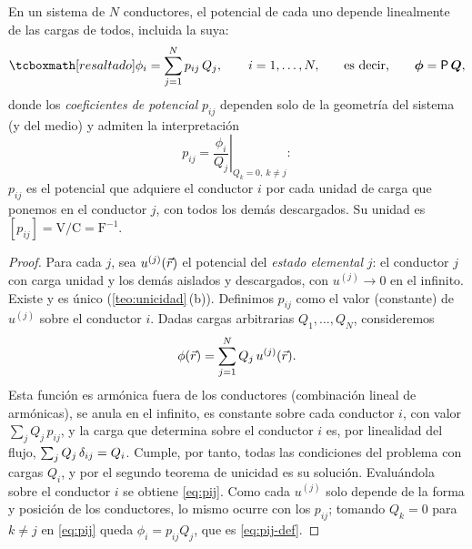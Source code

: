\begin{teorema}\label{teo:pij}
En un sistema de $N$ conductores, el potencial de cada uno depende linealmente de las cargas de todos, incluida la suya:
\begin{equation}\label{eq:pij}
  \resalta{\phi_i=\sum_{j=1}^{N}p_{ij}\,Q_j,\qquad i=1,\dots,N,}\qquad\text{es decir,}\qquad\vphi=\Pm\,\vQ ,
\end{equation}
donde los \emph{coeficientes de potencial} $p_{ij}$ dependen solo de la geometría del sistema (y del medio) y admiten la interpretación
\begin{equation}\label{eq:pij-def}
  p_{ij}=\left.\frac{\phi_i}{Q_j}\right|_{Q_k=0,\ k\neq j}:
\end{equation}
$p_{ij}$ es el potencial que adquiere el conductor $i$ por cada unidad de carga que ponemos en el conductor $j$, con todos los demás descargados.
Su unidad es $[p_{ij}]=\mathrm{V/C}=\mathrm{F^{-1}}$.
\end{teorema}
\begin{proof}
Para cada $j$, sea $u^{(j)}(\vec{r})$ el potencial del \emph{estado elemental} $j$: el conductor $j$ con carga unidad y los demás aislados y descargados,
con $u^{(j)}\to0$ en el infinito. Existe y es único (\cref{teo:unicidad}\,(b)). Definimos $p_{ij}$ como el valor (constante) de $u^{(j)}$ sobre el
conductor $i$. Dadas cargas arbitrarias $Q_1,\dots,Q_N$, consideremos
\[
  \phi(\vec{r})=\sum_{j=1}^{N}Q_j\,u^{(j)}(\vec{r}) .
\]
Esta función es armónica fuera de los conductores (combinación lineal de armónicas), se anula en el infinito, es constante sobre cada conductor
$i$, con valor $\sum_jQ_j\,p_{ij}$, y la carga que determina sobre el conductor $i$ es, por linealidad del flujo,
$\sum_jQ_j\,\delta_{ij}=Q_i$. Cumple, por tanto, todas las condiciones del problema con cargas $Q_i$, y por el segundo teorema de unicidad es su
solución. Evaluándola sobre el conductor $i$ se obtiene \cref{eq:pij}. Como cada $u^{(j)}$ solo depende de la forma y posición de los conductores,
lo mismo ocurre con los $p_{ij}$; tomando $Q_k=0$ para $k\neq j$ en \cref{eq:pij} queda $\phi_i=p_{ij}Q_j$, que es \cref{eq:pij-def}.
\end{proof}

